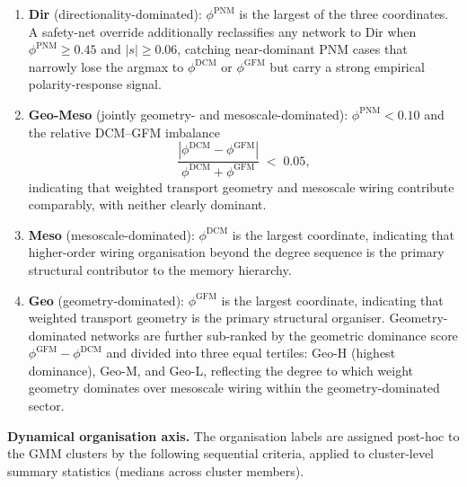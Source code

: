 \documentclass[aps,superscriptaddress,11pt]{revtex4-2}
\theoremstyle{definition}
\theoremstyle{plain}
\begin{document}
\begin{enumerate}
\item \textbf{Dir} (directionality-dominated): $\phi^{\mathrm{PNM}}$
is the largest of the three coordinates.  A safety-net override
additionally reclassifies any network to Dir when $\phi^{\mathrm{PNM}}
\geq 0.45$ and $|s| \geq 0.06$, catching near-dominant PNM cases that
narrowly lose the argmax to $\phi^{\mathrm{DCM}}$ or $\phi^{\mathrm{GFM}}$
but carry a strong empirical polarity-response signal.

\item \textbf{Geo-Meso} (jointly geometry- and mesoscale-dominated):
$\phi^{\mathrm{PNM}} < 0.10$ and the relative DCM--GFM imbalance
\[
\frac{|\phi^{\mathrm{DCM}} - \phi^{\mathrm{GFM}}|}
     {\phi^{\mathrm{DCM}} + \phi^{\mathrm{GFM}}}
\;<\; 0.05,
\]
indicating that weighted transport geometry and mesoscale wiring
contribute comparably, with neither clearly dominant.

\item \textbf{Meso} (mesoscale-dominated): $\phi^{\mathrm{DCM}}$ is the
largest coordinate, indicating that higher-order wiring organisation
beyond the degree sequence is the primary structural contributor to the
memory hierarchy.

\item \textbf{Geo} (geometry-dominated): $\phi^{\mathrm{GFM}}$ is the
largest coordinate, indicating that weighted transport geometry is the
primary structural organiser.  Geometry-dominated networks are further
sub-ranked by the geometric dominance score $\phi^{\mathrm{GFM}} -
\phi^{\mathrm{DCM}}$ and divided into three equal tertiles:
Geo-H (highest dominance), Geo-M, and Geo-L, reflecting the degree to
which weight geometry dominates over mesoscale wiring within the
geometry-dominated sector.
\end{enumerate}

\medskip
\noindent\textbf{Dynamical organisation axis.}
The organisation labels are assigned post-hoc to the GMM clusters by
the following sequential criteria, applied to cluster-level summary
statistics (medians across cluster members).
\end{document}
